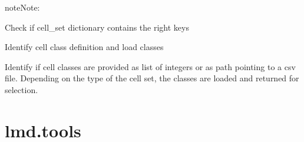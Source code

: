 \documentclass[a4paper,10pt,english,openany,oneside]{sphinxmanual}
\begin{document}
\begin{fulllineitems}
\begin{sphinxadmonition}{note}{Note:}
\begin{sphinxVerbatim}[commandchars=\\\{\}]
\end{sphinxVerbatim}
\end{sphinxadmonition}

\begin{fulllineitems}
\label{\detokenize{pages/modules:lmd.lib.SegmentationLoader.check_cell_set_sanity}}
\sphinxAtStartPar
Check if cell\_set dictionary contains the right keys

\end{fulllineitems}


\begin{fulllineitems}
\label{\detokenize{pages/modules:lmd.lib.SegmentationLoader.load_classes}}
\sphinxAtStartPar
Identify cell class definition and load classes

\sphinxAtStartPar
Identify if cell classes are provided as list of integers or as path pointing to a csv file.
Depending on the type of the cell set, the classes are loaded and returned for selection.

\end{fulllineitems}


\end{fulllineitems}



\section{lmd.tools}
\label{\detokenize{pages/modules:module-lmd.tools}}\label{\detokenize{pages/modules:lmd-tools}}
\end{document}

